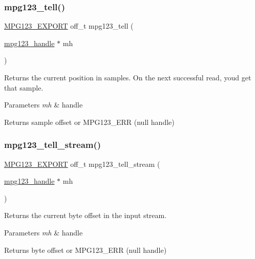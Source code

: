 \subsubsection{\texorpdfstring{mpg123\_tell()}{mpg123\_tell()}}
{\footnotesize\ttfamily \mbox{\hyperlink{mpg123_8h_a2ba98cfba3f760879df70e755b2a61cc}{M\+P\+G123\+\_\+\+E\+X\+P\+O\+RT}} off\+\_\+t mpg123\+\_\+tell (\begin{DoxyParamCaption}\item[{\mbox{\hyperlink{group__mpg123__init_ga6728e2839a395f3a07d4514da659faca}{mpg123\+\_\+handle}} $\ast$}]{mh }\end{DoxyParamCaption})}

Returns the current position in samples. On the next successful read, you\textquotesingle{}d get that sample. 
\begin{DoxyParams}{Parameters}
{\em mh} & handle \\
\hline
\end{DoxyParams}
\begin{DoxyReturn}{Returns}
sample offset or M\+P\+G123\+\_\+\+E\+RR (null handle) 
\end{DoxyReturn}
\mbox{\label{group__mpg123__seek_ga385bcc9fd3cec22289410828eac3938b}} 
\subsubsection{\texorpdfstring{mpg123\_tell\_stream()}{mpg123\_tell\_stream()}}
{\footnotesize\ttfamily \mbox{\hyperlink{mpg123_8h_a2ba98cfba3f760879df70e755b2a61cc}{M\+P\+G123\+\_\+\+E\+X\+P\+O\+RT}} off\+\_\+t mpg123\+\_\+tell\+\_\+stream (\begin{DoxyParamCaption}\item[{\mbox{\hyperlink{group__mpg123__init_ga6728e2839a395f3a07d4514da659faca}{mpg123\+\_\+handle}} $\ast$}]{mh }\end{DoxyParamCaption})}

Returns the current byte offset in the input stream. 
\begin{DoxyParams}{Parameters}
{\em mh} & handle \\
\hline
\end{DoxyParams}
\begin{DoxyReturn}{Returns}
byte offset or M\+P\+G123\+\_\+\+E\+RR (null handle) 
\end{DoxyReturn}
\mbox{\label{group__mpg123__seek_gaab81ee3527294d01e2c10a10e91022ee}} 
